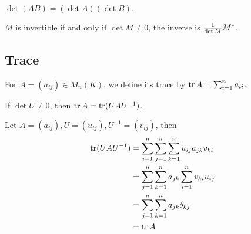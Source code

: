 \begin{pro}
$\det (AB) = (\det A)(\det B).$
\end{pro}

\begin{pro}
$M$ is invertible if and only if $\det M \neq 0$,
the inverse is ${1 \over \det M} M^\ast$.
\end{pro}

\subsection{Trace}
For $A = (a_{ij})\in M_n(K)$, we define its trace by $\mathop{\mathrm{tr}} A = \sum_{i=1}^n a_{ii}$.

\begin{pro}
If $\det U \neq 0$, then $\mathop{\mathrm{tr}} A = \mathop{\mathrm{tr}} (UAU^{-1})$.
\end{pro}

\begin{prf}
Let $A = (a_{ij}), U = (u_{ij}), U^{-1} = (v_{ij})$, then
\begin{align*}
\mathop{\mathrm{tr}} (UAU^{-1}) & = \sum_{i=1}^n \sum_{j=1}^n \sum_{k=1}^n u_{ij} a_{jk} v_{ki} \\
& = \sum_{j=1}^n \sum_{k=1}^n a_{jk} \sum_{i=1}^n v_{ki} u_{ij} \\
& = \sum_{j=1}^n \sum_{k=1}^n a_{jk} \delta_{kj} \\
& = \mathop{\mathrm{tr}} A
\end{align*}
\end{prf}
